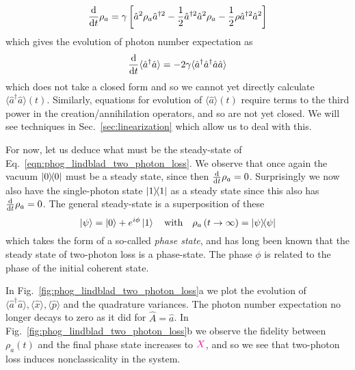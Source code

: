 \begin{equation}\label{eqn:phog_lindblad_two_photon_loss}
\frac{\mathrm{d}}{\mathrm{d}t} \rho_a = \gamma\left[\hat{a}^2 \rho_a \hat{a}^{\dagger 2} - \frac{1}{2} \hat{a}^{\dagger 2} \hat{a}^2 \rho_a - \frac{1}{2} \rho \hat{a}^{\dagger 2} \hat{a}^2\right]
\end{equation}
which gives the evolution of photon number expectation as 
\begin{equation}\label{eqn:aa_not_closed}
\frac{\mathrm{d}}{\mathrm{d}t} \langle \hat{a}^\dagger \hat{a}\rangle = - 2 \gamma \langle \hat{a}^\dagger \hat{a}^\dagger \hat{a}\hat{a}\rangle
\end{equation}
which does not take a closed form and so we cannot yet directly calculate $\langle \hat{a}^\dagger \hat{a}\rangle\left(t\right)$. Similarly, equations for evolution of $\langle\hat{a}\rangle\left(t\right)$ require terms to the third power in the creation/annihilation operators, and so are not yet closed.  We will see techniques in Sec.~\ref{sec:linearization} which allow us to deal with this.

For now, let us deduce what must be the steady-state of Eq.~\ref{eqn:phog_lindblad_two_photon_loss}. We observe that once again the vacuum $\dyad{0}$ must be a steady state, since then $\frac{\mathrm{d}}{\mathrm{d}t} \rho_a=0$. Surprisingly we now also have the single-photon state $\dyad{1}$ as a steady state since this also has $\frac{\mathrm{d}}{\mathrm{d}t} \rho_a=0$. The general steady-state is a superposition of these
\begin{equation}\label{eqn:phog_phase_state}
\ket{\psi} = \ket{0} + e^{i \phi} \ket{1} \qq{with} \rho_a\left(t \rightarrow \infty\right) = \dyad{\psi}
\end{equation}
which takes the form of a so-called \emph{phase state}, and has long been known that the steady state of two-photon loss is a phase-state. The phase $\phi$ is related to the phase of the initial coherent state. %


In Fig.~\ref{fig:phog_lindblad_two_photon_loss}a we plot the evolution of $\langle \hat{a}^\dagger \hat{a}\rangle, \langle \hat{x}\rangle, \langle \hat{p}\rangle$ and the quadrature variances. The photon number expectation no longer decays to zero as it did for $\hat{A}=\hat{a}$. In Fig.~\ref{fig:phog_lindblad_two_photon_loss}b we observe the fidelity between $\rho_a\left(t\right)$ and the final phase state increases to $\textcolor{magenta}{X}$, and so we see that two-photon loss induces nonclassicality in the system. 


